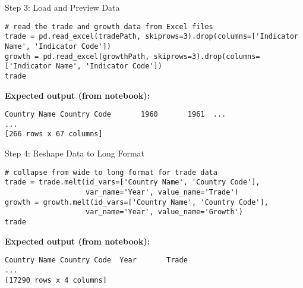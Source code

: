 \documentclass[notes,11pt, aspectratio=169, xcolor=table]{beamer}
\begin{document}
\begin{frame}[fragile]{Step 3: Load and Preview Data}
\begin{verbatim}
# read the trade and growth data from Excel files
trade = pd.read_excel(tradePath, skiprows=3).drop(columns=['Indicator Name', 'Indicator Code'])
growth = pd.read_excel(growthPath, skiprows=3).drop(columns=['Indicator Name', 'Indicator Code'])
trade
\end{verbatim}
\vspace{0.5ex}
\textbf{Expected output (from notebook):}
\begin{verbatim}
Country Name Country Code       1960       1961  ...
...
[266 rows x 67 columns]
\end{verbatim}
\end{frame}

\begin{frame}[fragile]{Step 4: Reshape Data to Long Format}
\begin{verbatim}
# collapse from wide to long format for trade data
trade = trade.melt(id_vars=['Country Name', 'Country Code'],
                   var_name='Year', value_name='Trade')
growth = growth.melt(id_vars=['Country Name', 'Country Code'],
                   var_name='Year', value_name='Growth')
trade
\end{verbatim}
\vspace{0.5ex}
\textbf{Expected output (from notebook):}
\begin{verbatim}
Country Name Country Code  Year       Trade
...
[17290 rows x 4 columns]
\end{verbatim}
\end{frame}
\end{document}
